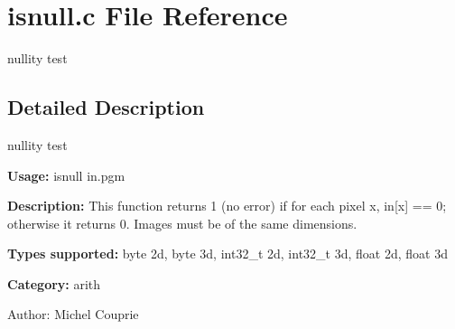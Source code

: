 \section{isnull.c File Reference}
\label{isnull_8c}
nullity test  




\label{_details}
\subsection{Detailed Description}
nullity test 

{\bf Usage:} isnull in.pgm

{\bf Description:} This function returns 1 (no error) if for each pixel x, in[x] == 0; otherwise it returns 0. Images must be of the same dimensions.

{\bf Types supported:} byte 2d, byte 3d, int32\_\-t 2d, int32\_\-t 3d, float 2d, float 3d

{\bf Category:} arith

\begin{Desc}
\item[Author:]Michel Couprie \end{Desc}
